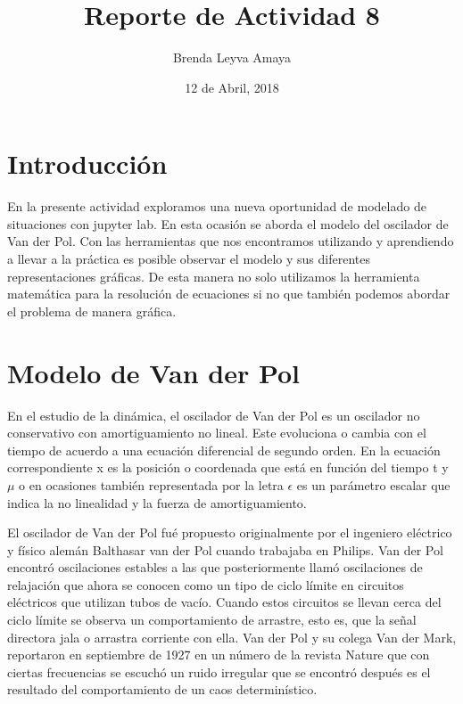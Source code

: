\documentclass{article} %
\title{Reporte de Actividad 8}
\author{Brenda Leyva Amaya}
\date{12 de Abril, 2018}
\begin{document}
\maketitle %


\section*{Introducción}

En la presente actividad exploramos una nueva oportunidad de modelado de situaciones con jupyter lab. En esta ocasión se aborda el modelo del oscilador de Van der Pol. Con las herramientas que nos encontramos utilizando y aprendiendo a llevar a la práctica es posible observar el modelo y sus diferentes representaciones gráficas. De esta manera no solo utilizamos la herramienta matemática para la resolución de ecuaciones si no que también podemos abordar el problema de manera gráfica.

\section{Modelo de Van der Pol}

En el estudio de la dinámica, el oscilador de Van der Pol es un oscilador no conservativo con amortiguamiento no lineal. Este evoluciona o cambia con el tiempo de acuerdo a una ecuación diferencial de segundo orden. En la ecuación correspondiente x es la posición o coordenada que está en función del tiempo t y $\mu$ o en ocasiones también representada por la letra $\epsilon$ es un parámetro escalar que indica la no linealidad y la fuerza de amortiguamiento. 

\vspace{0.5 cm}

El oscilador de Van der Pol fué propuesto originalmente por el ingeniero eléctrico y físico alemán Balthasar van der Pol cuando trabajaba en Philips. Van der Pol encontró oscilaciones estables a las que posteriormente llamó oscilaciones de relajación que ahora se conocen como un tipo de ciclo límite en circuitos eléctricos que utilizan tubos de vacío. Cuando estos circuitos se llevan cerca del ciclo límite se observa un comportamiento de arrastre, esto es, que la señal directora jala o arrastra corriente con ella. Van der Pol y su colega Van der Mark, reportaron en septiembre de 1927 en un número de la revista Nature que con ciertas frecuencias se escuchó un ruido irregular que se encontró después es el resultado del comportamiento de un caos determinístico. 
\end{document}

